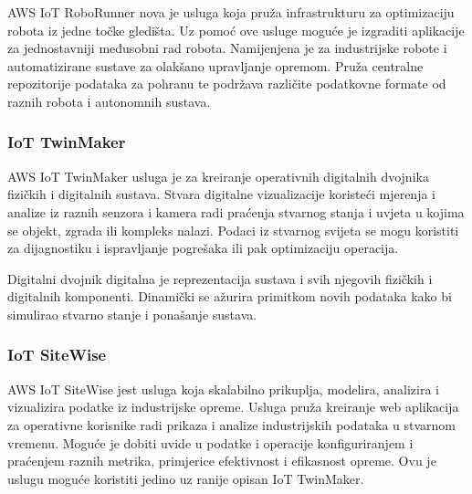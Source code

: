 AWS IoT RoboRunner nova je usluga koja pruža infrastrukturu za optimizaciju robota iz jedne točke gledišta. Uz pomoć ove usluge moguće je izgraditi aplikacije za jednostavniji međusobni rad robota. Namijenjena je za industrijske robote i automatizirane sustave za olakšano upravljanje opremom. Pruža centralne repozitorije podataka za pohranu te podržava različite podatkovne formate od raznih robota i autonomnih sustava.

\subsubsection{IoT TwinMaker}

AWS IoT TwinMaker usluga je za kreiranje operativnih digitalnih dvojnika fizičkih i digitalnih sustava. Stvara digitalne vizualizacije koristeći mjerenja i analize iz raznih senzora i kamera radi praćenja stvarnog stanja i uvjeta u kojima se objekt, zgrada ili kompleks nalazi. Podaci iz stvarnog svijeta se mogu koristiti za dijagnostiku i ispravljanje pogrešaka ili pak optimizaciju operacija. 

Digitalni dvojnik  digitalna je reprezentacija sustava i svih njegovih fizičkih i digitalnih komponenti. Dinamički se ažurira primitkom novih podataka kako bi simulirao stvarno stanje i ponašanje sustava. 


\subsubsection{IoT SiteWise}

AWS IoT SiteWise jest usluga koja skalabilno prikuplja, modelira, analizira i vizualizira podatke iz industrijske opreme. Usluga pruža kreiranje web aplikacija za operativne korisnike radi prikaza i analize industrijskih podataka u stvarnom vremenu. Moguće je dobiti uvide u podatke i operacije konfiguriranjem i praćenjem raznih metrika, primjerice efektivnost i efikasnost opreme. Ovu je uslugu moguće koristiti jedino uz ranije opisan IoT TwinMaker.

\eject